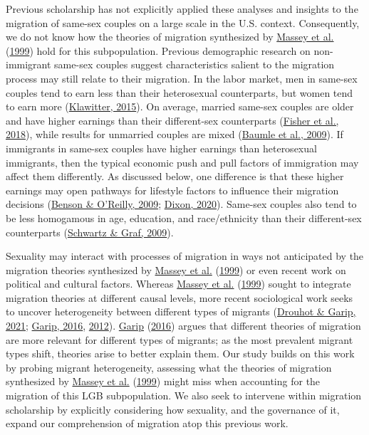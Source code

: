 \documentclass[
  11pt,
]{article}
\begin{document}
Previous scholarship has not explicitly applied these analyses and insights to the migration of same-sex couples on a large scale in the U.S. context. Consequently, we do not know how the theories of migration synthesized by \protect\hyperlink{ref-massey_1999}{Massey et al.} (\protect\hyperlink{ref-massey_1999}{1999}) hold for this subpopulation. Previous demographic research on non-immigrant same-sex couples suggest characteristics salient to the migration process may still relate to their migration. In the labor market, men in same-sex couples tend to earn less than their heterosexual counterparts, but women tend to earn more (\protect\hyperlink{ref-klawitter_2015}{Klawitter, 2015}). On average, married same-sex couples are older and have higher earnings than their different-sex counterparts (\protect\hyperlink{ref-fisher_2018}{Fisher et al., 2018}), while results for unmarried couples are mixed (\protect\hyperlink{ref-baumle_2009}{Baumle et al., 2009}). If immigrants in same-sex couples have higher earnings than heterosexual immigrants, then the typical economic push and pull factors of immigration may affect them differently. As discussed below, one difference is that these higher earnings may open pathways for lifestyle factors to influence their migration decisions (\protect\hyperlink{ref-benson_2009}{Benson \& O'Reilly, 2009}; \protect\hyperlink{ref-dixon_2020}{Dixon, 2020}). Same-sex couples also tend to be less homogamous in age, education, and race/ethnicity than their different-sex counterparts (\protect\hyperlink{ref-schwartz_2009}{Schwartz \& Graf, 2009}).

Sexuality may interact with processes of migration in ways not anticipated by the migration theories synthesized by \protect\hyperlink{ref-massey_1999}{Massey et al.} (\protect\hyperlink{ref-massey_1999}{1999}) or even recent work on political and cultural factors. Whereas \protect\hyperlink{ref-massey_1999}{Massey et al.} (\protect\hyperlink{ref-massey_1999}{1999}) sought to integrate migration theories at different causal levels, more recent sociological work seeks to uncover heterogeneity between different types of migrants (\protect\hyperlink{ref-drouhot_2021_what}{Drouhot \& Garip, 2021}; \protect\hyperlink{ref-garip_2016}{Garip, 2016}, \protect\hyperlink{ref-garip_2012}{2012}). \protect\hyperlink{ref-garip_2016}{Garip} (\protect\hyperlink{ref-garip_2016}{2016}) argues that different theories of migration are more relevant for different types of migrants; as the most prevalent migrant types shift, theories arise to better explain them. Our study builds on this work by probing migrant heterogeneity, assessing what the theories of migration synthesized by \protect\hyperlink{ref-massey_1999}{Massey et al.} (\protect\hyperlink{ref-massey_1999}{1999}) might miss when accounting for the migration of this LGB subpopulation. We also seek to intervene within migration scholarship by explicitly considering how sexuality, and the governance of it, expand our comprehension of migration atop this previous work.
\end{document}
